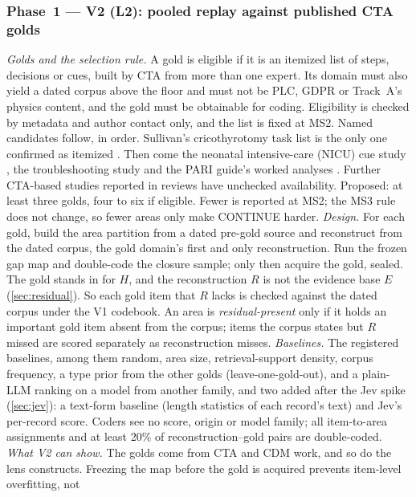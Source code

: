 \subsubsection{Phase~1 --- V2 (L2): pooled replay against published CTA golds}

\emph{Golds and the selection rule.} \evfut{} A gold is eligible if it is an itemized list of
steps, decisions or cues, built by CTA from more than one expert. Its domain must also yield a dated
corpus above the floor and must not be PLC, GDPR or Track~A's physics content, and the gold must be
obtainable for coding. Eligibility is checked by metadata and author contact only,
and the list is fixed at MS2. Named candidates follow, in order. Sullivan's
cricothyrotomy task list is the only one confirmed as itemized \parencite{sullivan2014use}. Then
come the neonatal intensive-care (NICU) cue study \parencite{crandall1993critical}, the troubleshooting study
\parencite{chao1994percentage} and the PARI guide's worked analyses \parencite{hall1995procedural}.
Further CTA-based studies reported in reviews \parencite{clark2008cognitive,tofelgrehl2013cognitive}
have unchecked availability.
Proposed: at least three golds, four to six if eligible. Fewer is reported at MS2; the MS3 rule
does not change, so fewer areas only make CONTINUE harder.
\emph{Design.} For each gold, build the area partition from a dated pre-gold source and
reconstruct from the dated corpus, the gold domain's first and only reconstruction. Run the frozen
gap map and double-code the closure sample; only then acquire the gold, sealed. \evint{} The gold stands in for
$H$, and the reconstruction $R$ is not the evidence base $E$ (\cref{sec:residual}). So each gold
item that $R$ lacks is checked against the dated corpus under the V1 codebook. An area is
\emph{residual-present} only if it holds an important gold item absent from the corpus; items the
corpus states but $R$ missed are scored separately as reconstruction misses.
\emph{Baselines.} The registered baselines, among them random, area size, retrieval-support
density, corpus frequency, a type prior from the other golds (leave-one-gold-out), and a plain-LLM
ranking on a model from another family, and two added after the Jev spike (\cref{sec:jev}): a
text-form baseline (length statistics of each record's text) and Jev's per-record score. Coders see no score, origin or model family; all
item-to-area assignments and at least 20\% of reconstruction--gold pairs are double-coded.
\emph{What V2 can show.} \evint{} The golds come from CTA and CDM work, and so do the lens
constructs. Freezing the map before the gold is acquired prevents item-level overfitting, not
